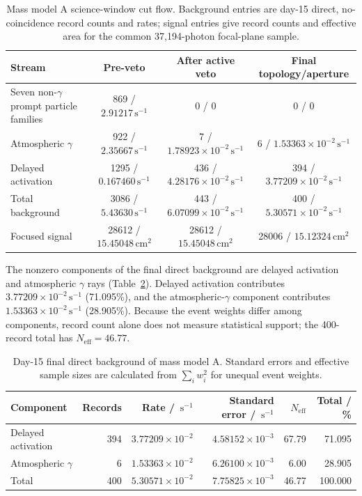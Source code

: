 \documentclass[11pt]{article}
\newcommand{\revblue}[1]{\textcolor{revisionblue}{#1}}
\newcommand{\cps}{\ensuremath{\,\mathrm{s^{-1}}}}
\begin{document}
\begin{table}[H]
\centering
\caption{Mass model A science-window cut flow. Background entries are day-15 direct, no-coincidence record counts and rates; signal entries give record counts and effective area for the common 37,194-photon focal-plane sample.}
\label{tab:phase2_cutflow}
\footnotesize
\begin{tabular}{lccc}
\toprule
Stream & Pre-veto & After active veto & Final topology/aperture \\
\midrule
\revblue{Seven non-$\gamma$ prompt particle families} & 869 / $2.91217\cps$ & 0 / 0 & 0 / 0 \\
\revblue{Atmospheric $\gamma$} & 922 / $2.35667\cps$ & 7 / $1.78923\times10^{-2}\cps$ & 6 / $1.53363\times10^{-2}\cps$ \\
Delayed activation & 1295 / $0.167460\cps$ & 436 / $4.28176\times10^{-2}\cps$ & 394 / $3.77209\times10^{-2}\cps$ \\
Total background & 3086 / $5.43630\cps$ & 443 / $6.07099\times10^{-2}\cps$ & 400 / $5.30571\times10^{-2}\cps$ \\
Focused signal & 28612 / $15.45048\,\mathrm{cm^2}$ & 28612 / $15.45048\,\mathrm{cm^2}$ & 28006 / $15.12324\,\mathrm{cm^2}$ \\
\bottomrule
\end{tabular}
\end{table}

The nonzero components of the final direct background are delayed activation
and \revblue{atmospheric $\gamma$ rays}
(Table~\ref{tab:reference_background_budget}). Delayed activation contributes
$3.77209\times10^{-2}\cps$ (71.095\%), and the \revblue{atmospheric-$\gamma$ component} contributes
$1.53363\times10^{-2}\cps$ (28.905\%). Because the event weights differ among
components, record count alone does not measure statistical support; the
400-record total has $N_{\mathrm{eff}}=46.77$.

\begin{table}[H]
\centering
\caption{Day-15 final direct background of mass model A. Standard errors and effective sample sizes are calculated from $\sum_i w_i^2$ for unequal event weights.}
\label{tab:reference_background_budget}
\footnotesize
\begin{tabular}{lrrrrr}
\toprule
Component & Records & Rate / $\cps$ & Standard error / $\cps$ & $N_{\mathrm{eff}}$ & Total / \% \\
\midrule
Delayed activation & 394 & $3.77209\times10^{-2}$ & $4.58152\times10^{-3}$ & 67.79 & 71.095 \\
\revblue{Atmospheric $\gamma$} & 6 & $1.53363\times10^{-2}$ & $6.26100\times10^{-3}$ & 6.00 & 28.905 \\
\midrule
Total & 400 & $5.30571\times10^{-2}$ & $7.75825\times10^{-3}$ & 46.77 & 100.000 \\
\bottomrule
\end{tabular}
\end{table}
\end{document}
